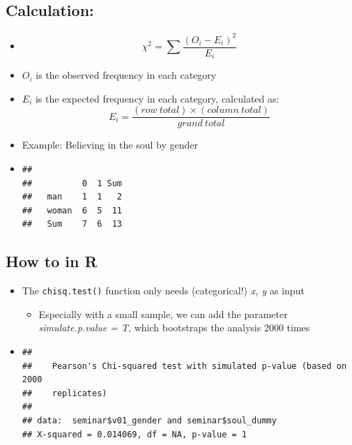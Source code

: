 \documentclass[
]{book}
\newenvironment{Shaded}{\begin{snugshade}}{\end{snugshade}}
\newcommand{\AttributeTok}[1]{\textcolor[rgb]{0.13,0.29,0.53}{#1}}
\newcommand{\FunctionTok}[1]{\textcolor[rgb]{0.13,0.29,0.53}{\textbf{#1}}}
\newcommand{\NormalTok}[1]{#1}
\newcommand{\SpecialCharTok}[1]{\textcolor[rgb]{0.81,0.36,0.00}{\textbf{#1}}}
\providecommand{\tightlist}{%
  \setlength{\itemsep}{0pt}\setlength{\parskip}{0pt}}
\begin{document}
\subsection{Calculation:}\label{calculation}

\begin{itemize}
\item
  \[\chi^2 = \sum \frac{(O_i - E_i)^2}{E_i}\]
\item
  \(O_i\) is the observed frequency in each category
\item
  \(E_i\) is the expected frequency in each category, calculated as: \[E_i = \frac{(row \ total) \times (column \ total)}{grand \ total}\]
\item
  Example: Believing in the soul by gender
\item
\begin{verbatim}
##        
##          0  1 Sum
##   man    1  1   2
##   woman  6  5  11
##   Sum    7  6  13
\end{verbatim}
\end{itemize}

\subsection{How to in R}\label{how-to-in-r}

\begin{itemize}
\item
  The \texttt{chisq.test()} function only needs (categorical!) \emph{x, y} as input

  \begin{itemize}
  \tightlist
  \item
    Especially with a small sample, we can add the parameter \emph{simulate.p.value = T}, which bootstraps the analysis 2000 times
  \end{itemize}
\item
\begin{Shaded}
\end{Shaded}

\begin{verbatim}
## 
##    Pearson's Chi-squared test with simulated p-value (based on 2000
##    replicates)
## 
## data:  seminar$v01_gender and seminar$soul_dummy
## X-squared = 0.014069, df = NA, p-value = 1
\end{verbatim}
\end{itemize}
\end{document}
